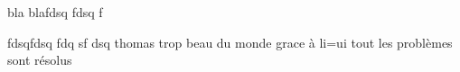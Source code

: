 bla blafdsq fdsq f

fdsqfdsq fdq
sf
dsq 
thomas trop beau du monde grace à li=ui tout les problèmes sont résolus 